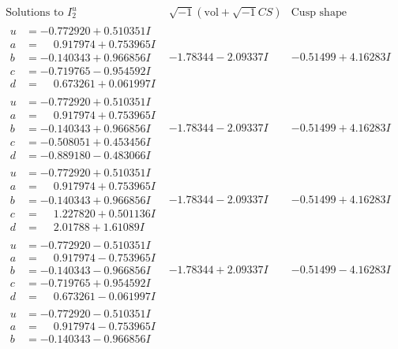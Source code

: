 \documentclass[1p]{elsarticle_modified}
\theoremstyle{definition}
\newcommand{\I}{\sqrt{-1}}
\begin{document}
$$\begin{array}{c|c|c}  
\text{Solutions to }I^u_{2}& \I (\text{vol} + \sqrt{-1}CS) & \text{Cusp shape}\\
 \hline 
\begin{aligned}
u &= -0.772920 + 0.510351 I \\
a &= \phantom{-}0.917974 + 0.753965 I \\
b &= -0.140343 + 0.966856 I \\
c &= -0.719765 - 0.954592 I \\
d &= \phantom{-}0.673261 + 0.061997 I\end{aligned}
 & -1.78344 - 2.09337 I & -0.51499 + 4.16283 I \\ \hline\begin{aligned}
u &= -0.772920 + 0.510351 I \\
a &= \phantom{-}0.917974 + 0.753965 I \\
b &= -0.140343 + 0.966856 I \\
c &= -0.508051 + 0.453456 I \\
d &= -0.889180 - 0.483066 I\end{aligned}
 & -1.78344 - 2.09337 I & -0.51499 + 4.16283 I \\ \hline\begin{aligned}
u &= -0.772920 + 0.510351 I \\
a &= \phantom{-}0.917974 + 0.753965 I \\
b &= -0.140343 + 0.966856 I \\
c &= \phantom{-}1.227820 + 0.501136 I \\
d &= \phantom{-}2.01788 + 1.61089 I\end{aligned}
 & -1.78344 - 2.09337 I & -0.51499 + 4.16283 I \\ \hline\begin{aligned}
u &= -0.772920 - 0.510351 I \\
a &= \phantom{-}0.917974 - 0.753965 I \\
b &= -0.140343 - 0.966856 I \\
c &= -0.719765 + 0.954592 I \\
d &= \phantom{-}0.673261 - 0.061997 I\end{aligned}
 & -1.78344 + 2.09337 I & -0.51499 - 4.16283 I \\ \hline\begin{aligned}
u &= -0.772920 - 0.510351 I \\
a &= \phantom{-}0.917974 - 0.753965 I \\
b &= -0.140343 - 0.966856 I \\

\end{aligned}
\end{array}$$
\end{document}

